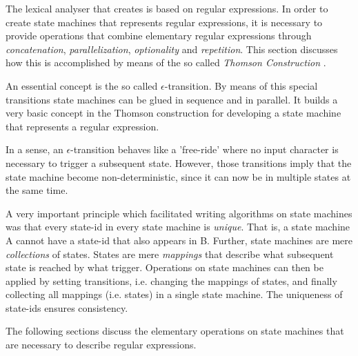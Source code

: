 The lexical analyser that {\quex} creates is based on regular expressions.  In
order to create state machines that represents regular expressions, it is
necessary to provide operations that combine elementary regular expressions
through {\it concatenation}, {\it parallelization}, {\it optionality} and {\it
    repetition}. This section discusses how this is accomplished by means
    of the so called {\it Thomson Construction} \cite{}.



An essential concept is the so called $\epsilon$-transition. By means of this
special transitions state machines can be glued in sequence and in parallel. It
builds a very basic concept in the Thomson construction for developing a state
machine that represents a regular expression.


In a sense, an $\epsilon$-transition behaves like a 'free-ride' where no input character
is necessary to trigger a subsequent state. However, those transitions imply that the 
state machine become non-deterministic, since it can now be in multiple states at the same time.

A very important principle which facilitated writing algorithms on state machines
was that every state-id in every state machine is {\it  unique\/}. That is, 
a state machine A cannot have a state-id that also appears in B. Further,
state machines are mere {\it collections} of states. States are mere {\it mappings}
that describe what subsequent state is reached by what trigger. Operations
on state machines can then be applied by setting transitions, i.e. changing
the mappings of states, and finally collecting all mappings (i.e. states) in
a single state machine. The uniqueness of state-ids ensures consistency.

The following sections discuss the elementary operations on state machines
that are necessary to describe regular expressions. 
